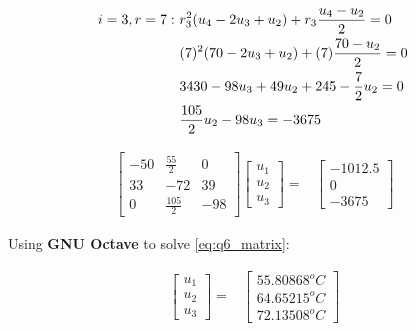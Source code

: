 	\begin{align}
		i=3,r=7: \ &
		r_{3}^{2}(u_{4} - 2u_{3} + u_{2})+r_{3}\frac{u_{4} - u_{2}}{2} = 0
		& \\ &
		(7)^{2}(70 - 2u_{3} + u_{2})+(7)\frac{70 - u_{2}}{2} = 0
		& \notag \\ &
		3430 - 98u_{3} + 49u_{2} + 245 - \frac{7}{2}u_{2} = 0
		& \notag \\ &
		\frac{105}{2}u_{2} - 98u_{3} = -3675
	\end{align}

	\begin{align}
		\begin{bmatrix}
			-50 & \frac{55}{2} & 0 \\[0.7em]
			33 & -72 & 39 \\[0.7em]
			0 & \frac{105}{2} & -98
		\end{bmatrix}
		\begin{bmatrix}
			u_{1} \\[0.7em]
			u_{2} \\[0.7em]
			u_{3}
		\end{bmatrix}
		=&
		\begin{bmatrix}
			-1012.5 \\[0.7em]
			0 \\[0.7em]
			-3675
		\end{bmatrix}&
		\label{eq:q6_matrix}
	\end{align}

	Using \textbf{GNU Octave} to solve \cref{eq:q6_matrix}:

	\begin{align}
		\begin{bmatrix}
			u_{1} \\[0.7em]
			u_{2} \\[0.7em]
			u_{3}
		\end{bmatrix}
		=&
		\begin{bmatrix}
			55.80868 ^{o}C \\[0.7em]
			64.65215 ^{o}C \\[0.7em]
			72.13508 ^{o}C
		\end{bmatrix}&
	\end{align}
